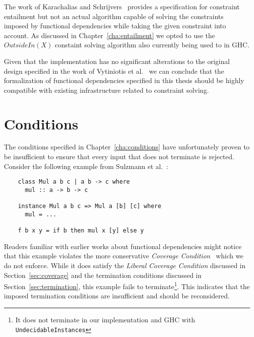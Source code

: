 The work of Karachalias and Schrijvers~\cite{Karachalias:2017:EFD:3156695.3122966}
provides a specification for constraint entailment but not an actual algorithm
capable of solving the constraints imposed by functional dependencies while
taking the given constraint into account. As discussed in
Chapter~\ref{cha:entailment} we opted to use the $OutsideIn(X)$ constaint solving
algorithm also currently being used to in GHC.

Given that the implementation has no significant alterations to the original
design specified in the work of Vytiniotis et
al.~\cite{outsideinx-modular-type-inference-with-local-assumptions} we can
conclude that the formalization of functional dependencies specified in this
thesis should be highly compatible with existing infrastructure related to
constraint solving.



\section{Conditions}

The conditions specified in Chapter~\ref{cha:conditions} have unfortunately
proven to be insufficient to ensure that every input that does not terminate is
rejected. Consider the following example from Sulzmann et
al.~\cite{fundeps-chrs}:

\begin{verbatim}
    class Mul a b c | a b -> c where
      mul :: a -> b -> c

    instance Mul a b c => Mul a [b] [c] where
      mul = ...

    f b x y = if b then mul x [y] else y
\end{verbatim}

Readers familiar with earlier works about functional dependencies might notice
that this example violates the more conservative \textit{Coverage
Condition}~\cite{fundeps-chrs} which we do not enforce. While it does satisfy the
\textit{Liberal Coverage Condition} discussed in Section~\ref{sec:coverage} and
the termination conditions discussed in Section~\ref{sec:termination}, this
example fails to terminate\footnote{It does not terminate in our implementation
and GHC with \texttt{UndecidableInstances}}. This indicates that the imposed
termination conditions are insufficient and should be reconsidered.


